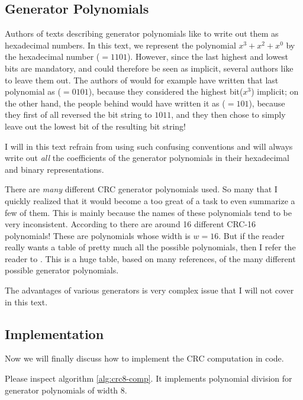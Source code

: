 \subsection{Generator Polynomials}

Authors of texts describing generator polynomials like to write out
them as hexadecimal numbers. In this text, we represent the polynomial
$x^3 + x^2 + x^0$ by the hexadecimal number ($=1101$). However,
since the last highest and lowest bits are mandatory, and could
therefore be seen as implicit, several authors like to leave them
out. The authors of \cite{press2007numerical_recipes} would for
example have written that last polynomial as ($=0101$), because
they considered the highest bit($x^{3}$) implicit; on the other hand,
the people behind \cite{Koopman04cyclicredundancy_embedded_networks}
would have written it as ($=101$), because they first of all
reversed the bit string to $1011$, and they then chose to simply leave
out the lowest bit of the resulting bit string!

I will in this text refrain from using such confusing conventions and
will always write out \textit{all} the coefficients of the generator
polynomials in their hexadecimal and binary representations.

There are \textit{many} different CRC generator polynomials used. So
many that I quickly realized that it would become a too great of a
task to even summarize a few of them. This is mainly because the names
of these polynomials tend to be very inconsistent. According to
\cite{cook:_catal_crc} there are around 16 different CRC-16
polynomials! These are polynomials whose width is $w=16$. But if the
reader really wants a table of pretty much all the possible
polynomials, then I refer the reader to \cite{cook:_catal_crc}. This
is a huge table, based on many references, of the many different
possible generator polynomials.

The advantages of various generators is very complex issue that I will
not cover in this text.

\subsection{Implementation}

Now we will finally discuss how to implement the CRC computation in
code.

Please inspect algorithm \ref{alg:crc8-comp}. It implements
polynomial division for generator polynomials of width 8.

